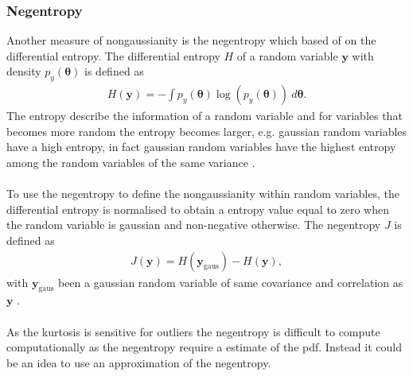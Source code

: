 \subsubsection{Negentropy}
Another measure of nongaussianity is the negentropy which based of on the differential entropy. The differential entropy $H$ of a random variable $\mathbf{y}$ with density $p_y (\boldsymbol{\theta})$ is defined as
\begin{align*}
H(\mathbf{y}) = - \int p_y (\boldsymbol{\theta}) \log (p_y (\boldsymbol{\theta})) \ d\boldsymbol{\theta}.
\end{align*}
The entropy describe the information of a random variable and for variables that becomes more random the entropy becomes larger, e.g. gaussian random variables have a high entropy, in fact gaussian random variables have the highest entropy among the random variables of the same variance \cite[p. 182]{ICA}.
\\ \\
To use the negentropy to define the nongaussianity within random variables, the differential entropy is normalised to obtain a entropy value equal to zero when the random variable is gaussian and non-negative otherwise. The negentropy $J$ is defined as 
\begin{align*}
J(\mathbf{y}) = H(\mathbf{y}_{\text{gaus}}) - H(\mathbf{y}),
\end{align*}
with $\mathbf{y}_{\text{gaus}}$ been a gaussian random variable of same covariance and correlation as $\mathbf{y}$ \cite[p. 182]{ICA}.
\\ \\
As the kurtosis is sensitive for outliers the negentropy is difficult to compute computationally as the negentropy require a estimate of the pdf. Instead it could be an idea to use an approximation of the negentropy.
 
